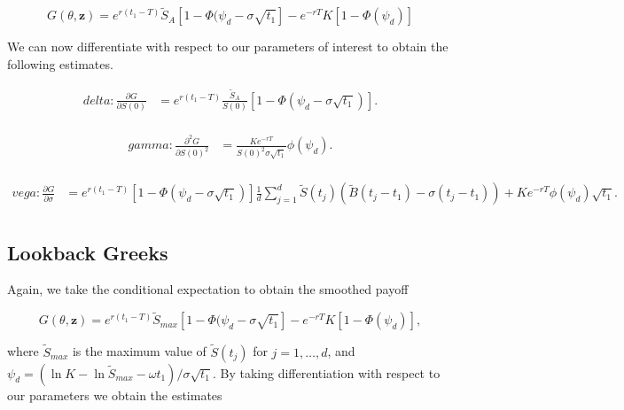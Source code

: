 \begin{equation*}
    G(\theta, \boldsymbol{z}) = e^{r(t_1 - T)} \widetilde{S}_A \left[1 - \Phi(\psi_d - \sigma \sqrt{t_1} \right] - e^{-rT}K\left[ 1 - \Phi(\psi_d) \right]
\end{equation*}

We can now differentiate with respect to our parameters of interest to obtain the following estimates.

\begin{equation*}
\begin{aligned}
    delta: \frac{\partial G}{\partial {S(0)}} &= e^{r(t_1 - T)} \frac{\widetilde{S}_A}{S(0)}\left[1 - \Phi(\psi_d - \sigma \sqrt{t_1}) \right]. \\[10pt]
\end{aligned}
\end{equation*}

\begin{equation*}
\begin{aligned}
    gamma: \frac{{\partial}^2 G}{\partial {S(0)}^2} &= \frac{Ke^{-rT}}{{S(0)}^2\sigma\sqrt{t_1}} \phi(\psi_d). \\[10pt]
\end{aligned}
\end{equation*}

\begin{equation*}
\begin{aligned}
    vega: \frac{{\partial} G}{\partial \sigma} &= e^{r(t_1 - T)} \left[1 - \Phi(\psi_d - \sigma \sqrt{t_1}) \right] \frac{1}{d}\sum_{j=1}^d{\widetilde{S}(t_j) (\widetilde{B}(t_j - t_1) - \sigma(t_j - t_1))} + Ke^{-rT}\phi(\psi_d)\sqrt{t_1}. \\[10pt]
\end{aligned}
\end{equation*}

\subsection{Lookback Greeks}
Again, we take the conditional expectation to obtain the smoothed payoff

\begin{equation*}
    G(\theta, \boldsymbol{z}) = e^{r(t_1 - T)} \widetilde{S}_{max} \left[1 - \Phi(\psi_d - \sigma \sqrt{t_1} \right] - e^{-rT}K\left[ 1 - \Phi(\psi_d) \right],
\end{equation*}

where $\widetilde{S}_{max}$ is the maximum value of $\widetilde{S}(t_j)$ for $j = 1,\dots,d$, and $\psi_d = (\ln{K} - \ln{\widetilde{S}_{max}} - \omega t_1) / \sigma \sqrt{t_1}$. By taking differentiation with respect to our parameters we obtain the estimates

